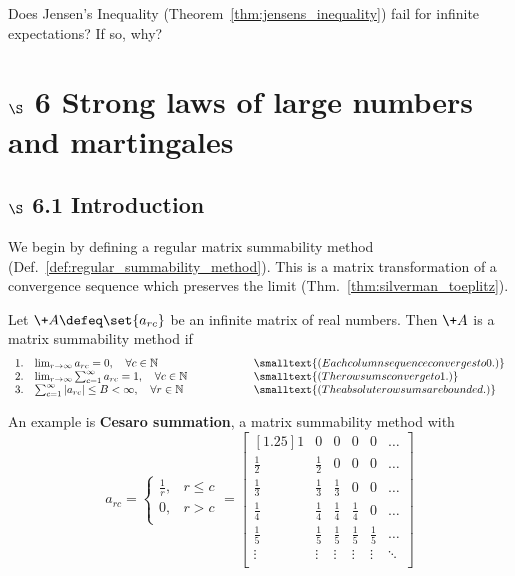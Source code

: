 \documentclass{article} %
\begin{document}
\begin{question}
Does Jensen's Inequality (Theorem~\ref{thm:jensens_inequality})	 fail for infinite expectations?  If so, why?
\label{qu:does_jensens_inequality_fail_for_infinite_expectations}
\end{question}





\section{$\S$ 6 Strong laws of large numbers and martingales}

\subsection{$\S$ 6.1 Introduction}

We begin by defining a regular matrix summability method (Def.~\ref{def:regular_summability_method}). This is a matrix transformation of a convergence sequence which preserves the limit (Thm.~\ref{thm:silverman_toeplitz}). 

\begin{definition}
Let $\+A \defeq \set{a_{rc}}$ be an infinite matrix of real numbers.  Then $\+A$ is a matrix summability method if 
\[\begin{array}{rlcl}
1. & \lim_{r \to \infty} a_{rc}=0, \quad \forall c \in \mathbb{N}&
\qquad \qquad & \smalltext{(Each column sequence converges to 0.)} \\
2. & \lim_{r \to \infty} \sum_{c=1}^\infty a_{rc}=1, \quad \forall c \in \mathbb{N}&
\qquad \qquad & \smalltext{(The row sums converge to 1.)} \\
3. & \sum_{c=1}^\infty |a_{rc}| \leq B < \infty, \quad \forall r \in \mathbb{N}&
\qquad \qquad & \smalltext{(The absolute row sums are bounded.)}
\end{array} \] 
\label{def:regular_summability_method}
\end{definition}

\begin{example}
An example is \textbf{Cesaro summation}, a matrix summability method with
%
\[ 
a_{rc} = 
\begin{cases}
\frac{1}{r}, &  r \leq c \\ 
0, &  r > c \\	
 \end{cases}
=
\begin{bmatrix}[1.25]
1 & 0 & 0 & 0 & 0 & \dots \\
\frac{1}{2} & \frac{1}{2} & 0 & 0 & 0 & \dots \\
\frac{1}{3} & \frac{1}{3} & \frac{1}{3} & 0 & 0 & \dots \\
\frac{1}{4} & \frac{1}{4} & \frac{1}{4} & \frac{1}{4} & 0 & \dots \\
\frac{1}{5} & \frac{1}{5} & \frac{1}{5} & \frac{1}{5} & \frac{1}{5} & \dots \\
\vdots & \vdots &  \vdots &  \vdots &  \vdots & \ddots \\ 
\end{bmatrix}
\]	
\end{example}
\end{document}
